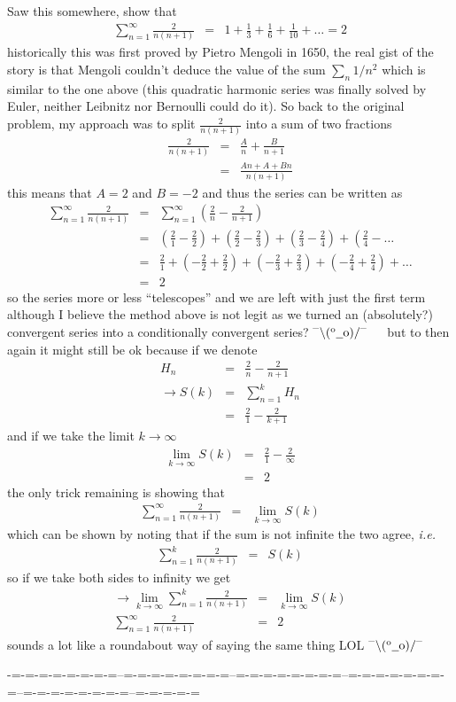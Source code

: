 \documentclass[aps,preprint,preprintnumbers,nofootinbib,showpacs,prd]{revtex4-1}
\newcommand{\ie}{{\it i.e.} }
\newcommand{\nbea}{\begin{eqnarray*}}
\newcommand{\neea}{\end{eqnarray*}}
\newcommand{\dunno}{$ {}^{\mbox {--}}\backslash(^{\rm o}{}\underline{\hspace{0.2cm}}{\rm o})/^{\mbox {--}}$}
\begin{document}
Saw this somewhere, show that
%
\nbea
\sum_{n=1}^\infty \frac{2}{n(n+1)} & = & 1+\frac{1}{3}+\frac{1}{6}+\frac{1}{10}+\ldots = 2
\neea
%
historically this was first proved by Pietro Mengoli in 1650, the real gist of the story is that Mengoli couldn't deduce the value of the sum $\sum_n 1/n^2$ which is similar to the one above (this quadratic harmonic series was finally solved by Euler, neither Leibnitz nor Bernoulli could do it). So back to the original problem, my approach was to split $\frac{2}{n(n+1)}$ into a sum of two fractions
%
\nbea
\frac{2}{n(n+1)} & = & \frac{A}{n}+\frac{B}{n+1} \\
& = & \frac{An+A+Bn}{n(n+1)}
\neea
%
this means that $A = 2$ and $B=-2$ and thus the series can be written as
%
\nbea
\sum_{n=1}^\infty \frac{2}{n(n+1)} & = & \sum_{n=1}^\infty \left(\frac{2}{n} - \frac{2}{n+1}\right) \\
& = & \left(\frac{2}{1} - \frac{2}{2}\right) + \left(\frac{2}{2} - \frac{2}{3}\right) + \left(\frac{2}{3} - \frac{2}{4}\right) + \left(\frac{2}{4} - \right. \ldots \\
& = & \frac{2}{1} + \left( - \frac{2}{2} + \frac{2}{2} \right) + \left( - \frac{2}{3}+ \frac{2}{3}\right) + \left( - \frac{2}{4}+ \frac{2}{4}\right) + \ldots \\
& = & 2
\neea
%
so the series more or less ``telescopes'' and we are left with just the first term although I believe the method above is not legit as we turned an (absolutely?) convergent series into a conditionally convergent series? \dunno ~~~but to then again it might still be ok because if we denote
%
\nbea
H_n & = & \frac{2}{n} -\frac{2}{n+1} \\
\to S(k) & = & \sum_{n=1}^k H_n \\
& = & \frac{2}{1} - \frac{2}{k+1}
\neea
%
and if we take the limit $k\to\infty$
%
\nbea
\lim_{k\to\infty} S(k) & = & \frac{2}{1} - \frac{2}{\infty} \\
& = & 2
\neea
%
the only trick remaining is showing that
%
\nbea
\sum_{n=1}^\infty \frac{2}{n(n+1)} & = & \lim_{k\to\infty} S(k)
\neea
%
which can be shown by noting that if the sum is not infinite the two agree, \ie
%
\nbea
\sum_{n=1}^k \frac{2}{n(n+1)} & = & S(k)
\neea
%
so if we take both sides to infinity we get
%
\nbea
\to \lim_{k\to\infty}\sum_{n=1}^k \frac{2}{n(n+1)} & = & \lim_{k\to\infty} S(k) \\
\sum_{n=1}^\infty \frac{2}{n(n+1)} & = & 2
\neea
%
sounds a lot like a roundabout way of saying the same thing LOL \dunno

-=-=-=-=-=-=-=-=--=-=-=-=-=-=-=-=--=-=-=-=-=-=-=-=--=-=-=-=-=-=-=-=--=-=-=-=-=-=-=-=--=-=-=-=-=
\end{document}

